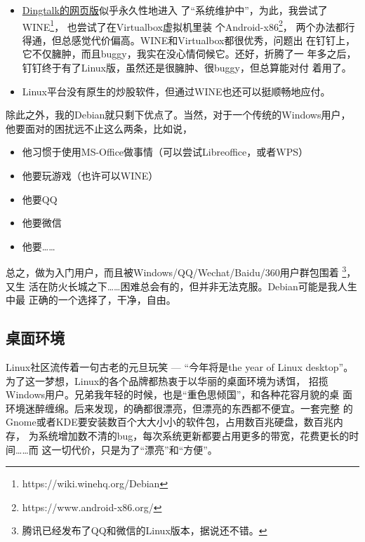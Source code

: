 \begin{itemize}
\item \href{https://im.dingtalk.com}{Dingtalk的网页版}似乎永久性地进入
  了“系统维护中”，为此，我尝试了WINE\footnote{https://wiki.winehq.org/Debian}，%
  也尝试了在Virtualbox虚拟机里装
  个Android-x86\footnote{https://www.android-x86.org/}，%
  两个办法都行得通，但总感觉代价偏高。WINE和Virtualbox都很优秀，问题出
  在钉钉上，它不仅臃肿，而且buggy，我实在没心情伺候它。还好，折腾了一
  年多之后，钉钉终于有了Linux版，虽然还是很臃肿、很buggy，但总算能对付
  着用了。
\item Linux平台没有原生的炒股软件，但通过WINE也还可以挺顺畅地应付。
\end{itemize}

除此之外，我的Debian就只剩下优点了。当然，对于一个传统的Windows用户，
他要面对的困扰远不止这么两条，比如说，

\begin{itemize}
\item 他习惯于使用MS-Office做事情（可以尝试Libreoffice，或者WPS）
\item 他要玩游戏（也许可以WINE）
\item 他要QQ
\item 他要微信
\item 他要……
\end{itemize}


总之，做为入门用户，而且被Windows/QQ/Wechat/Baidu/360用户群包围着
\footnote{腾讯已经发布了QQ和微信的Linux版本，据说还不错。}，又生
活在防火长城之下……困难总会有的，但并非无法克服。Debian可能是我人生中最
正确的一个选择了，干净，自由。

\subsection{桌面环境}

Linux社区流传着一句古老的元旦玩笑 --- “今年将是the year of Linux
desktop”。为了这一梦想，Linux的各个品牌都热衷于以华丽的桌面环境为诱饵，
招揽Windows用户。兄弟我年轻的时候，也是“重色思倾国”，和各种花容月貌的桌
面环境迷醉缠绵。后来发现，的确都很漂亮，但漂亮的东西都不便宜。一套完整
的Gnome或者KDE要安装数百个大大小小的软件包，占用数百兆硬盘，数百兆内存，
为系统增加数不清的bug，每次系统更新都要占用更多的带宽，花费更长的时间……而
这一切代价，只是为了“漂亮”和“方便”。

